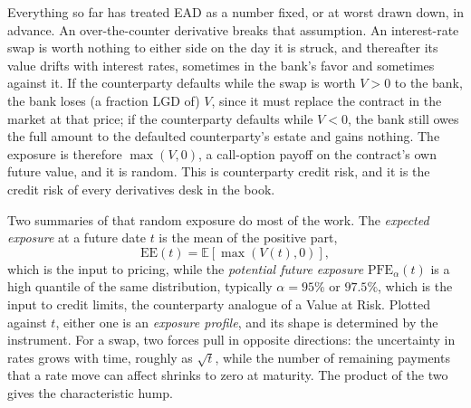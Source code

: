 \documentclass[../ai_in_finance]{subfiles}
\begin{document}
Everything so far has treated EAD as a number fixed, or at worst drawn down, in advance. An over-the-counter derivative breaks that assumption. An interest-rate swap is worth nothing to either side on the day it is struck, and thereafter its value drifts with interest rates, sometimes in the bank's favor and sometimes against it. If the counterparty defaults while the swap is worth $V>0$ to the bank, the bank loses (a fraction LGD of) $V$, since it must replace the contract in the market at that price; if the counterparty defaults while $V<0$, the bank still owes the full amount to the defaulted counterparty's estate and gains nothing. The exposure is therefore $\max(V,0)$, a call-option payoff on the contract's own future value, and it is random. This is counterparty credit risk, and it is the credit risk of every derivatives desk in the book.

Two summaries of that random exposure do most of the work. The \emph{expected exposure} at a future date $t$ is the mean of the positive part,
\begin{equation}
\label{eq:creditrisk-ee}
\text{EE}(t) = \mathbb{E}\!\left[\max\!\left(V(t),0\right)\right],
\end{equation}
which is the input to pricing, while the \emph{potential future exposure} $\text{PFE}_{\alpha}(t)$ is a high quantile of the same distribution, typically $\alpha = 95\%$ or $97.5\%$, which is the input to credit limits, the counterparty analogue of a Value at Risk. Plotted against $t$, either one is an \emph{exposure profile}, and its shape is determined by the instrument. For a swap, two forces pull in opposite directions: the uncertainty in rates grows with time, roughly as $\sqrt{t}$, while the number of remaining payments that a rate move can affect shrinks to zero at maturity. The product of the two gives the characteristic hump.
\end{document}
